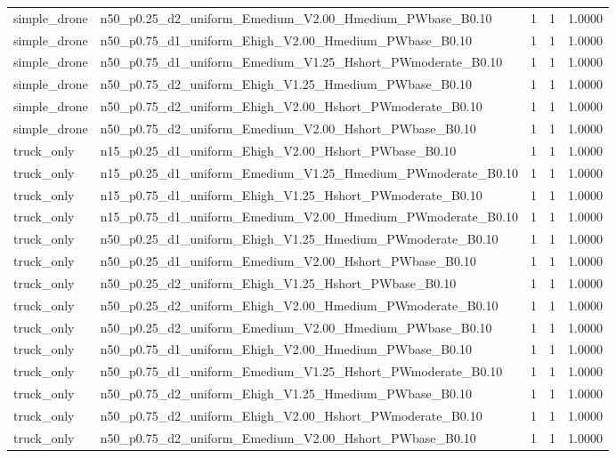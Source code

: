 \begin{tabular}{llrrr}
simple_drone & n50_p0.25_d2_uniform_Emedium_V2.00_Hmedium_PWbase_B0.10 & 1 & 1 & 1.0000 \\
simple_drone & n50_p0.75_d1_uniform_Ehigh_V2.00_Hmedium_PWbase_B0.10 & 1 & 1 & 1.0000 \\
simple_drone & n50_p0.75_d1_uniform_Emedium_V1.25_Hshort_PWmoderate_B0.10 & 1 & 1 & 1.0000 \\
simple_drone & n50_p0.75_d2_uniform_Ehigh_V1.25_Hmedium_PWbase_B0.10 & 1 & 1 & 1.0000 \\
simple_drone & n50_p0.75_d2_uniform_Ehigh_V2.00_Hshort_PWmoderate_B0.10 & 1 & 1 & 1.0000 \\
simple_drone & n50_p0.75_d2_uniform_Emedium_V2.00_Hshort_PWbase_B0.10 & 1 & 1 & 1.0000 \\
truck_only & n15_p0.25_d1_uniform_Ehigh_V2.00_Hshort_PWbase_B0.10 & 1 & 1 & 1.0000 \\
truck_only & n15_p0.25_d1_uniform_Emedium_V1.25_Hmedium_PWmoderate_B0.10 & 1 & 1 & 1.0000 \\
truck_only & n15_p0.75_d1_uniform_Ehigh_V1.25_Hshort_PWmoderate_B0.10 & 1 & 1 & 1.0000 \\
truck_only & n15_p0.75_d1_uniform_Emedium_V2.00_Hmedium_PWmoderate_B0.10 & 1 & 1 & 1.0000 \\
truck_only & n50_p0.25_d1_uniform_Ehigh_V1.25_Hmedium_PWmoderate_B0.10 & 1 & 1 & 1.0000 \\
truck_only & n50_p0.25_d1_uniform_Emedium_V2.00_Hshort_PWbase_B0.10 & 1 & 1 & 1.0000 \\
truck_only & n50_p0.25_d2_uniform_Ehigh_V1.25_Hshort_PWbase_B0.10 & 1 & 1 & 1.0000 \\
truck_only & n50_p0.25_d2_uniform_Ehigh_V2.00_Hmedium_PWmoderate_B0.10 & 1 & 1 & 1.0000 \\
truck_only & n50_p0.25_d2_uniform_Emedium_V2.00_Hmedium_PWbase_B0.10 & 1 & 1 & 1.0000 \\
truck_only & n50_p0.75_d1_uniform_Ehigh_V2.00_Hmedium_PWbase_B0.10 & 1 & 1 & 1.0000 \\
truck_only & n50_p0.75_d1_uniform_Emedium_V1.25_Hshort_PWmoderate_B0.10 & 1 & 1 & 1.0000 \\
truck_only & n50_p0.75_d2_uniform_Ehigh_V1.25_Hmedium_PWbase_B0.10 & 1 & 1 & 1.0000 \\
truck_only & n50_p0.75_d2_uniform_Ehigh_V2.00_Hshort_PWmoderate_B0.10 & 1 & 1 & 1.0000 \\
truck_only & n50_p0.75_d2_uniform_Emedium_V2.00_Hshort_PWbase_B0.10 & 1 & 1 & 1.0000 \\
\bottomrule
\end{tabular}
